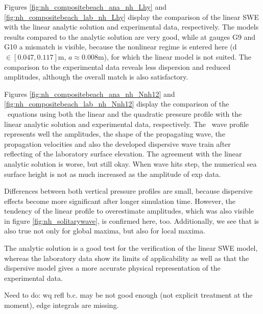 Figures \eqref{fig:nh_compositebeach_ana_nh_Lhy} and \eqref{fig:nh_compositebeach_lab_nh_Lhy} display the comparison of the linear SWE with the linear analytic solution and experimental data, respectively.
The models results compared to the analytic solution are very good, while at gauges G9 and G10 a mismatch is visible, because the nonlinear regime is entered here (d $\in [0.047,0.117]$m, $a\approx0.008$m), for which the linear model is not suited.
The comparison to the experimental data reveals less dispersion and reduced amplitudes, although the overall match is also satisfactory.

Figures \eqref{fig:nh_compositebeach_ana_nh_Nnh12} and \eqref{fig:nh_compositebeach_lab_nh_Nnh12} display the comparison of the \nh\ equations using both the linear and the quadratic pressure profile with the linear analytic solution and experimental data, respectively. The \nh\ wave profile represents well the amplitudes, the shape of the propagating wave, the propagation velocities and also the developed dispersive wave train after reflecting of the laboratory surface elevation. The agreement with the linear analytic solution is worse, but still okay.
When wave hits step, the numerical sea surface height is not as much increased as the amplitude of exp data. 

Differences between both vertical pressure profiles are small, because dispersive effects become more significant after longer simulation time. However, the tendency of the linear profile to overestimate amplitudes, which was also visible in figure \ref{fig:nh_solitarywave}, is confirmed here, too. Additionally, we see that is also true not only for global maxima, but also for local maxima.

The analytic solution is a good test for the verification of the linear SWE model, whereas the laboratory data show its limits of applicability as well as that the dispersive model gives a more accurate physical representation of the experimental data.

Need to do: wq refl b.c. may be not good enough (not explicit treatment at the moment), edge integrals are missing.


